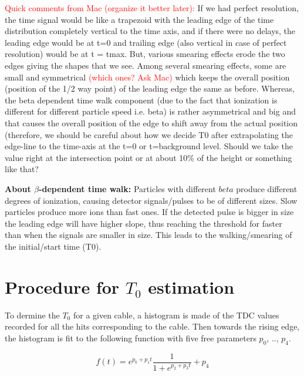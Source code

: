 \documentclass[12pt,epsfig]{article}
\def\t0{$T_0$ }
\begin{document}
\textcolor{red}{Quick comments from Mac (organize it better later):} If we had perfect resolution, the time signal would be like a trapezoid with the leading edge of the time distribution completely vertical to the time axis, and if there were no delays, the leading edge would be at t=0 and trailing edge (also vertical in case of perfect resolution) would be at t = tmax. But, various smearing effects erode the two edges giving the shapes that we see. Among several smearing effects, some are small and symmetrical \textcolor{red}{(which ones? Ask Mac)} which keeps the overall position (position of the 1/2 way point) of the leading edge the same as before. Whereas, the beta dependent time walk component (due to the fact that ionization is different for different particle speed i.e. beta) is rather asymmetrical and big and that causes the overall position of the edge to shift away from the actual position (therefore, we should be careful about how we decide T0 after extrapolating the edge-line to the time-axis at the t=0 or t=background level. Should we take the value right at the intersection point or at about 10\% of the height or something like that?


\textbf{About $\beta$-dependent time walk:} Particles with different $beta$ produce different degrees of ionization, causing detector signals/pulses to be of different sizes. Slow particles produce more ions than fast ones. If the detected pulse is bigger in size the leading edge will have higher slope, thus reaching the threshold for faster than when the signals are smaller in size. This leads to the walking/smearing of the initial/start time (T0).

\section{Procedure for \t0 estimation}
To dermine the $T_0$ for a given cable, a histogram is made of the TDC values recorded for all the hits corresponding to the cable. Then towards the rising edge, the histogram is fit to the following function with five free parameters $p_0$, .., $p_4$.



\begin{equation}
    \label{T0fit}
    f(t) = e^{p_0 + p_1t} \frac{1}{1 + e^{p_2 + p_3t}}  + p_4
\end{equation}
\end{document}
